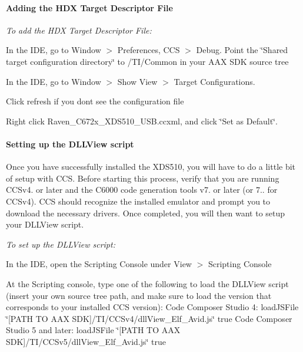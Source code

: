 \hypertarget{a00362_subsubsection__adding_the_hdx_target_descriptor_file_}{}\paragraph{Adding the H\+D\+X Target Descriptor File}\label{a00362_subsubsection__adding_the_hdx_target_descriptor_file_}
 {\itshape  To add the H\+D\+X Target Descriptor File\+:} 
\begin{DoxyEnumerate}
\item In the I\+D\+E, go to Window $>$ Preferences, C\+C\+S $>$ Debug. Point the \char`\"{}\+Shared target configuration directory\char`\"{} to /\+T\+I/\+Common in your A\+A\+X S\+D\+K source tree  
\item In the I\+D\+E, go to Window $>$ Show View $>$ Target Configurations.  
\item Click refresh if you don\textquotesingle{}t see the configuration file  
\item Right click Raven\+\_\+\+C672x\+\_\+\+X\+D\+S510\+\_\+\+U\+S\+B.\+ccxml, and click \char`\"{}\+Set as Default\char`\"{}.  
\end{DoxyEnumerate}

\hypertarget{a00362_subsubsection__setting_up_the_dllview_script_}{}\paragraph{Setting up the D\+L\+L\+View script}\label{a00362_subsubsection__setting_up_the_dllview_script_}
 Once you have successfully installed the X\+D\+S510, you will have to do a little bit of setup with C\+C\+S. Before starting this process, verify that you are running C\+C\+Sv4. or later and the C6000 code generation tools v7. or later (or 7.. for C\+C\+Sv4). C\+C\+S should recognize the installed emulator and prompt you to download the necessary drivers. Once completed, you will then want to setup your D\+L\+L\+View script.

{\itshape  To set up the D\+L\+L\+View script\+:} 
\begin{DoxyEnumerate}
\item In the I\+D\+E, open the Scripting Console under View $>$ Scripting Console  
\item At the Scripting console, type one of the following to load the D\+L\+L\+View script (insert your own source tree path, and make sure to load the version that corresponds to your installed C\+C\+S version)\+:  Code Composer Studio 4\+: {\ttfamily load\+J\+S\+File \char`\"{}\mbox{[}\+P\+A\+T\+H T\+O A\+A\+X S\+D\+K\mbox{]}/\+T\+I/\+C\+C\+Sv4/dll\+View\+\_\+\+Elf\+\_\+\+Avid.\+js\char`\"{} true } Code Composer Studio 5 and later\+: {\ttfamily load\+J\+S\+File \char`\"{}\mbox{[}\+P\+A\+T\+H T\+O A\+A\+X S\+D\+K\mbox{]}/\+T\+I/\+C\+C\+Sv5/dll\+View\+\_\+\+Elf\+\_\+\+Avid.\+js\char`\"{} true }  
\end{DoxyEnumerate}

